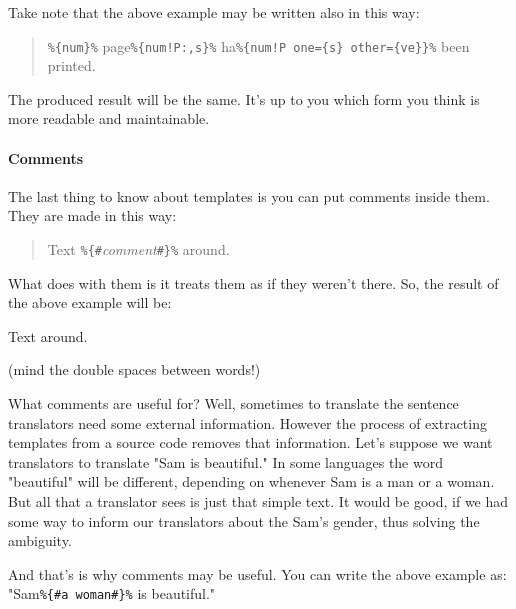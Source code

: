 \vspace{2em}

Take note that the above example may be written also in this way:
\begin{quote}
	\verb+%{num}%+ page\verb+%{num!P:,s}%+ ha\verb+%{num!P one={s} other={ve}}%+ been printed.
\end{quote}
The produced result will be the same. It's up to you which form you think is more readable and maintainable. 

\paragraph{Comments} The last thing to know about \mulan{} templates is you can put comments inside them.
They are made in this way:
\begin{quote}
	Text \verb+%{#+\textit{comment}\verb+#}%+ around.
\end{quote}
What \mulan{} does with them is it treats them as if they weren't there. So, the result of the above example will be:
\begin{verbatim*}
Text  around.
\end{verbatim*}(mind the double spaces between words!)

What comments are useful for? Well, sometimes to translate the sentence translators need some external information. 
However the process of extracting templates from a source code removes that information. Let's suppose we want translators to translate "Sam is beautiful."
In some languages the word "beautiful" will be different, depending on whenever Sam is a man or a woman. But all that a translator sees is just that simple text.
It would be good, if we had some way to inform our translators about the Sam's gender, thus solving the ambiguity. 

And that's is why comments may be useful. You can write the above example as: "Sam\verb+%{#a woman#}%+ is beautiful."
